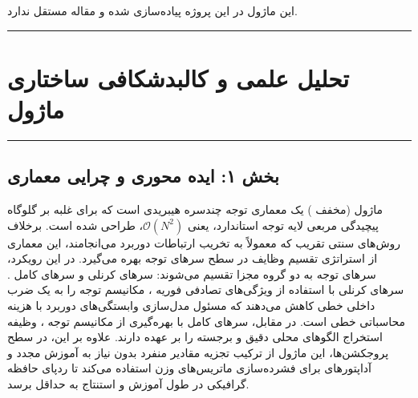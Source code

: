 \clearpage
{}
\vspace*{0.2cm}

این ماژول در این پروژه پیاده‌سازی شده و مقاله مستقل ندارد.
\noindent\rule{\textwidth}{1.2pt}
\vspace*{0.1cm}
\section{تحلیل علمی و کالبدشکافی ساختاری ماژول }
\label{sec:mod_orion}
\vspace*{-0.2cm}
\noindent\rule{\textwidth}{0.5pt}
\vspace*{0.3cm}

\subsection*{بخش ۱: ایده محوری و چرایی معماری }
ماژول  (مخفف ) یک معماری توجه چندسره هیبریدی است که برای غلبه بر گلوگاه پیچیدگی مربعی لایه توجه استاندارد، یعنی $\mathcal{O}(N^2)$، طراحی شده است. برخلاف روش‌های سنتی تقریب که معمولاً به تخریب ارتباطات دوربرد می‌انجامند، این معماری از استراتژی تقسیم وظایف در سطح سرهای توجه  بهره می‌گیرد. در این رویکرد، سرهای توجه به دو گروه مجزا تقسیم می‌شوند: سرهای کرنلی  و سرهای کامل .
سرهای کرنلی با استفاده از ویژگی‌های تصادفی فوریه ، مکانیسم توجه را به یک ضرب داخلی خطی کاهش می‌دهند که مسئول مدل‌سازی وابستگی‌های دوربرد با هزینه محاسباتی خطی است. در مقابل، سرهای کامل با بهره‌گیری از مکانیسم توجه ، وظیفه استخراج الگوهای محلی دقیق و برجسته را بر عهده دارند.
علاوه بر این، در سطح پروجکشن‌ها، این ماژول از ترکیب تجزیه مقادیر منفرد  بدون نیاز به آموزش مجدد و آداپتورهای  برای فشرده‌سازی ماتریس‌های وزن استفاده می‌کند تا ردپای حافظه گرافیکی در طول آموزش و استنتاج به حداقل برسد.


